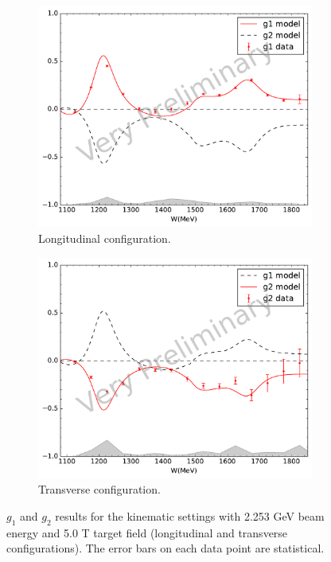 \begin{figure}[p!]
  \centering
  \begin{subfigure}[t]{0.79\textwidth}
    \includegraphics[width=\textwidth]{figs/g1g2-model-22535000.pdf}
    \caption{Longitudinal configuration. \label{C8S4F1a}}
  \end{subfigure}
  \begin{subfigure}[t]{0.79\textwidth}
    \includegraphics[width=\textwidth]{figs/g1g2-model-22535090.pdf}
    \caption{Transverse configuration. \label{C8S4F1b}}
  \end{subfigure}
  \caption[$g_1$ and $g_2$ results with $E=2.253$ GeV and $B=5.0$ T.]{$g_1$ and $g_2$ results for the kinematic settings with 2.253 GeV beam energy and 5.0 T target field (longitudinal and transverse configurations). The error bars on each data point are statistical. \label{C8S4F1}}
\end{figure}

